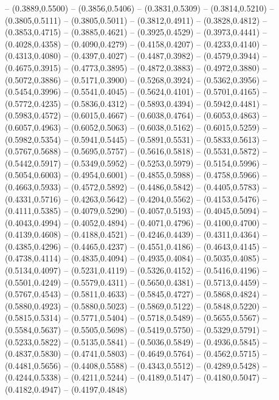 {	-- (0.3889,0.5500)
	-- (0.3856,0.5406)
	-- (0.3831,0.5309)
	-- (0.3814,0.5210)
	-- (0.3805,0.5111)
	-- (0.3805,0.5011)
	-- (0.3812,0.4911)
	-- (0.3828,0.4812)
	-- (0.3853,0.4715)
	-- (0.3885,0.4621)
	-- (0.3925,0.4529)
	-- (0.3973,0.4441)
	-- (0.4028,0.4358)
	-- (0.4090,0.4279)
	-- (0.4158,0.4207)
	-- (0.4233,0.4140)
	-- (0.4313,0.4080)
	-- (0.4397,0.4027)
	-- (0.4487,0.3982)
	-- (0.4579,0.3944)
	-- (0.4675,0.3915)
	-- (0.4773,0.3895)
	-- (0.4872,0.3883)
	-- (0.4972,0.3880)
	-- (0.5072,0.3886)
	-- (0.5171,0.3900)
	-- (0.5268,0.3924)
	-- (0.5362,0.3956)
	-- (0.5454,0.3996)
	-- (0.5541,0.4045)
	-- (0.5624,0.4101)
	-- (0.5701,0.4165)
	-- (0.5772,0.4235)
	-- (0.5836,0.4312)
	-- (0.5893,0.4394)
	-- (0.5942,0.4481)
	-- (0.5983,0.4572)
	-- (0.6015,0.4667)
	-- (0.6038,0.4764)
	-- (0.6053,0.4863)
	-- (0.6057,0.4963)
	-- (0.6052,0.5063)
	-- (0.6038,0.5162)
	-- (0.6015,0.5259)
	-- (0.5982,0.5354)
	-- (0.5941,0.5445)
	-- (0.5891,0.5531)
	-- (0.5833,0.5613)
	-- (0.5767,0.5688)
	-- (0.5695,0.5757)
	-- (0.5616,0.5818)
	-- (0.5531,0.5872)
	-- (0.5442,0.5917)
	-- (0.5349,0.5952)
	-- (0.5253,0.5979)
	-- (0.5154,0.5996)
	-- (0.5054,0.6003)
	-- (0.4954,0.6001)
	-- (0.4855,0.5988)
	-- (0.4758,0.5966)
	-- (0.4663,0.5933)
	-- (0.4572,0.5892)
	-- (0.4486,0.5842)
	-- (0.4405,0.5783)
	-- (0.4331,0.5716)
	-- (0.4263,0.5642)
	-- (0.4204,0.5562)
	-- (0.4153,0.5476)
	-- (0.4111,0.5385)
	-- (0.4079,0.5290)
	-- (0.4057,0.5193)
	-- (0.4045,0.5094)
	-- (0.4043,0.4994)
	-- (0.4052,0.4894)
	-- (0.4071,0.4796)
	-- (0.4100,0.4700)
	-- (0.4139,0.4608)
	-- (0.4188,0.4521)
	-- (0.4246,0.4439)
	-- (0.4311,0.4364)
	-- (0.4385,0.4296)
	-- (0.4465,0.4237)
	-- (0.4551,0.4186)
	-- (0.4643,0.4145)
	-- (0.4738,0.4114)
	-- (0.4835,0.4094)
	-- (0.4935,0.4084)
	-- (0.5035,0.4085)
	-- (0.5134,0.4097)
	-- (0.5231,0.4119)
	-- (0.5326,0.4152)
	-- (0.5416,0.4196)
	-- (0.5501,0.4249)
	-- (0.5579,0.4311)
	-- (0.5650,0.4381)
	-- (0.5713,0.4459)
	-- (0.5767,0.4543)
	-- (0.5811,0.4633)
	-- (0.5845,0.4727)
	-- (0.5868,0.4824)
	-- (0.5880,0.4923)
	-- (0.5880,0.5023)
	-- (0.5869,0.5122)
	-- (0.5848,0.5220)
	-- (0.5815,0.5314)
	-- (0.5771,0.5404)
	-- (0.5718,0.5489)
	-- (0.5655,0.5567)
	-- (0.5584,0.5637)
	-- (0.5505,0.5698)
	-- (0.5419,0.5750)
	-- (0.5329,0.5791)
	-- (0.5233,0.5822)
	-- (0.5135,0.5841)
	-- (0.5036,0.5849)
	-- (0.4936,0.5845)
	-- (0.4837,0.5830)
	-- (0.4741,0.5803)
	-- (0.4649,0.5764)
	-- (0.4562,0.5715)
	-- (0.4481,0.5656)
	-- (0.4408,0.5588)
	-- (0.4343,0.5512)
	-- (0.4289,0.5428)
	-- (0.4244,0.5338)
	-- (0.4211,0.5244)
	-- (0.4189,0.5147)
	-- (0.4180,0.5047)
	-- (0.4182,0.4947)
	-- (0.4197,0.4848)
}
